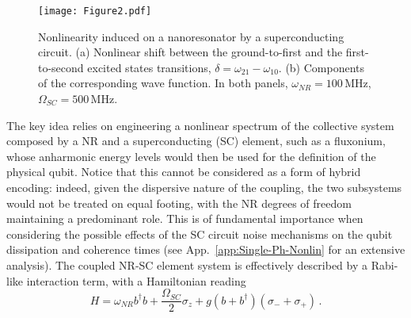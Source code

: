 \documentclass[aps,twocolumn,groupedaddress,superscriptaddress,floatfix,amsmath,amssymb,prb]{revtex4-1}
\begin{document}
\begin{figure} 
\centering
\texttt{[image: Figure2.pdf]} 
\caption{
Nonlinearity induced on a nanoresonator by a superconducting circuit. 
(a) Nonlinear shift between the ground-to-first and the first-to-second excited states transitions, $\delta = \omega_{21}-\omega_{10}$. 
(b) Components of the corresponding wave function. In both panels, $\omega_{NR} = 100\,$MHz, $\Omega_{SC}  = 500\,$MHz.}
\label{fig:NLfromSC}
\end{figure}

The key idea relies on engineering a nonlinear spectrum of the collective system composed by a NR and a superconducting (SC) element, such as a fluxonium, 
whose anharmonic energy levels would then be used for the definition of the physical qubit. Notice that this cannot be considered as a form of hybrid encoding: indeed, given the dispersive nature of the coupling, the two subsystems would not be treated on equal footing, with the NR degrees of freedom maintaining a predominant role. This is of fundamental importance when considering the possible effects of the SC circuit noise mechanisms on the qubit dissipation and coherence times (see App.~\ref{app:Single-Ph-Nonlin} for an extensive analysis). The coupled NR-SC element system is effectively described by a Rabi-like interaction term, with a Hamiltonian reading
\begin{equation}
H = \omega_{NR} b^\dagger b + \frac{\Omega_{SC}}{2}\sigma_z + g(b+b^\dagger)(\sigma_- + \sigma_+) \, .
\label{eq:H_NRSC}
\end{equation}
\end{document}
